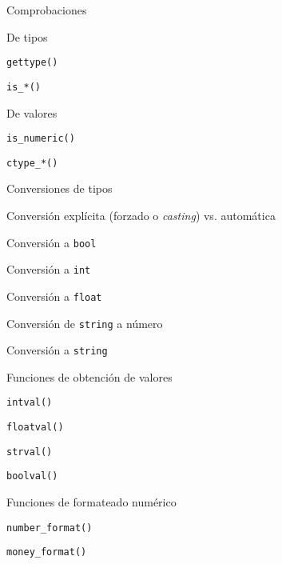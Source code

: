 \begin{longenum}
\begin{longenum}
\begin{longenum}
            \item Comprobaciones
            \begin{longenum}
                \item De tipos
                \begin{longenum}
                    \item \texttt{gettype()}
                    \item \texttt{is\_*()}
                \end{longenum}
                \item De valores
                \begin{longenum}
                    \item \texttt{is\_numeric()}
                    \item \texttt{ctype\_*()}
                \end{longenum}
            \end{longenum}
            \item Conversiones de tipos
            \begin{longenum}
                \item Conversión explícita (forzado o \textit{casting}) vs. automática
                \item Conversión a \texttt{bool}
                \item Conversión a \texttt{int}
                \item Conversión a \texttt{float}
                \item Conversión de \texttt{string} a número
                \item Conversión a \texttt{string}
                \item Funciones de obtención de valores
                \begin{longenum}
                    \item \texttt{intval()}
                    \item \texttt{floatval()}
                    \item \texttt{strval()}
                    \item \texttt{boolval()}
                \end{longenum}
                \item Funciones de formateado numérico
                \begin{longenum}
                    \item \texttt{number\_format()}
                    \item \texttt{money\_format()}

\end{longenum}
\end{longenum}
\end{longenum}
\end{longenum}
\end{longenum}
